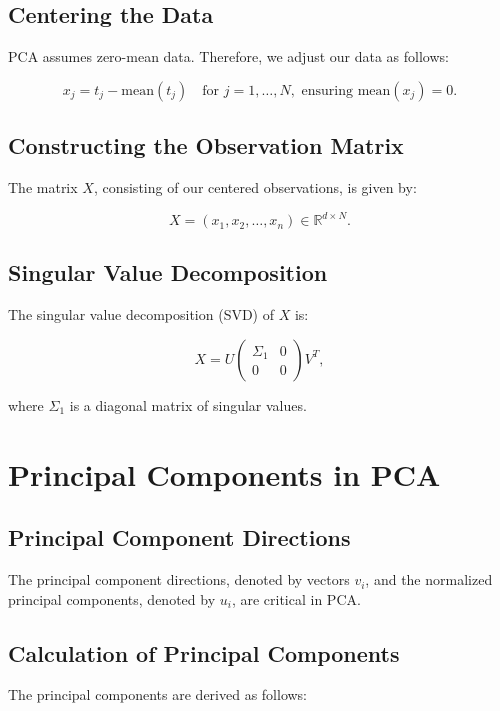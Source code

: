 \subsection{Centering the Data}

PCA assumes zero-mean data. Therefore, we adjust our data as follows:

\[
x_j = t_j - \text{mean}(t_j) \quad \text{for } j=1,\ldots,N, \text{ ensuring } \text{mean}(x_j) = 0.
\]

\subsection{Constructing the Observation Matrix}

The matrix \( X \), consisting of our centered observations, is given by:

\[
X = (x_1, x_2, \ldots, x_n) \in \mathbb{R}^{d \times N}.
\]

\subsection{Singular Value Decomposition}

The singular value decomposition (SVD) of \( X \) is:

\[
X = U\begin{pmatrix}\Sigma_1 & 0 \\ 0 & 0\end{pmatrix} V^T,
\]

where \(\Sigma_1\) is a diagonal matrix of singular values.

\section{Principal Components in PCA}

\subsection{Principal Component Directions}

The principal component directions, denoted by vectors \( v_i \), and the normalized principal components, denoted by \( u_i \), are critical in PCA.

\subsection{Calculation of Principal Components}

The principal components are derived as follows:

